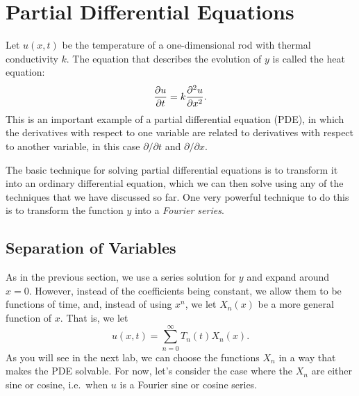 \documentclass[10pt,driverfallback=hypertex]{report}
\begin{document}
\chapter{Partial Differential Equations}
\newpage

Let $u(x,t)$ be the temperature of a one-dimensional rod with thermal
conductivity $k$. The equation that describes the evolution of $y$ is
called the heat equation:
\begin{dmath*}
  \pp{u}{t} =  k\pptwo{u}{x}.
\end{dmath*}
This is an important example of a partial differential equation (PDE),
in which the derivatives with respect to one variable are related to
derivatives with respect to another variable, in this case
$\partial/\partial t$ and $\partial/\partial x$.

The basic technique for solving partial differential equations is to
transform it into an ordinary differential equation, which we can then
solve using any of the techniques that we have discussed so far. One
very powerful technique to do this is to transform the function $y$
into a \emph{Fourier series}.

\section{Separation of Variables}
As in the previous section, we use a series solution for $y$ and
expand around $x=0$. However, instead of the coefficients being
constant, we allow them to be functions of time, and, instead of using
$x^n$, we let $X_n(x)$ be a more general function of $x$. That is, we
let
\begin{dmath*}
  \boxed{u(x,t) = \sum_{n=0}^\infty T_n(t) X_n(x)}.
\end{dmath*}
As you will see in the next lab, we can choose the functions $X_n$ in
a way that makes the PDE solvable. For now, let's consider the case
where the $X_n$ are either sine or cosine, i.e.\ when $u$ is a Fourier
sine or cosine series.
\end{document}
